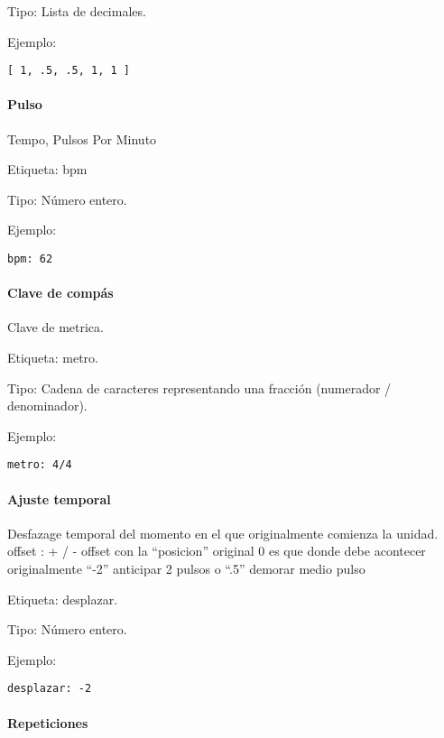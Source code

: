 \documentclass[]{article}
\let\oldparagraph\paragraph
\renewcommand{\paragraph}[1]{\oldparagraph{#1}\mbox{}}
\begin{document}
Tipo: Lista de decimales.

Ejemplo:

\begin{Verbatim}
[ 1, .5, .5, 1, 1 ]
\end{Verbatim}

\hypertarget{pulso}{%
\paragraph{Pulso}\label{pulso}}

Tempo, Pulsos Por Minuto

Etiqueta: bpm

Tipo: Número entero.

Ejemplo:

\begin{Verbatim}
bpm: 62
\end{Verbatim}

\hypertarget{clave-de-compuxe1s}{%
\paragraph{Clave de compás}\label{clave-de-compuxe1s}}

Clave de metrica.

Etiqueta: metro.

Tipo: Cadena de caracteres representando una fracción (numerador /
denominador).

Ejemplo:

\begin{Verbatim}
metro: 4/4
\end{Verbatim}

\hypertarget{ajuste-temporal}{%
\paragraph{Ajuste temporal}\label{ajuste-temporal}}

Desfazage temporal del momento en el que originalmente comienza la
unidad. offset : + / - offset con la ``posicion'' original 0 es que
donde debe acontecer originalmente ``-2'' anticipar 2 pulsos o ``.5''
demorar medio pulso

Etiqueta: desplazar.

Tipo: Número entero.

Ejemplo:

\begin{Verbatim}
desplazar: -2
\end{Verbatim}

\hypertarget{repeticiones}{%
\paragraph{Repeticiones}\label{repeticiones}}
\end{document}
